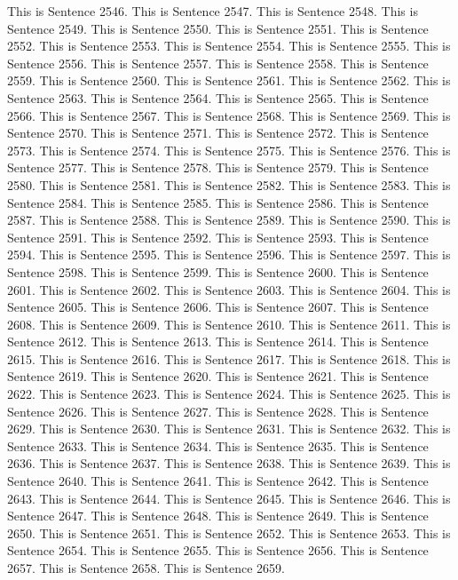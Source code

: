 \documentclass{article}
\begin{document}
This is Sentence 2546.
This is Sentence 2547.
This is Sentence 2548.
This is Sentence 2549.
This is Sentence 2550.
This is Sentence 2551.
This is Sentence 2552.
This is Sentence 2553.
This is Sentence 2554.
This is Sentence 2555.
This is Sentence 2556.
This is Sentence 2557.
This is Sentence 2558.
This is Sentence 2559.
This is Sentence 2560.
This is Sentence 2561.
This is Sentence 2562.
This is Sentence 2563.
This is Sentence 2564.
This is Sentence 2565.
This is Sentence 2566.
This is Sentence 2567.
This is Sentence 2568.
This is Sentence 2569.
This is Sentence 2570.
This is Sentence 2571.
This is Sentence 2572.
This is Sentence 2573.
This is Sentence 2574.
This is Sentence 2575.
This is Sentence 2576.
This is Sentence 2577.
This is Sentence 2578.
This is Sentence 2579.
This is Sentence 2580.
This is Sentence 2581.
This is Sentence 2582.
This is Sentence 2583.
This is Sentence 2584.
This is Sentence 2585.
This is Sentence 2586.
This is Sentence 2587.
This is Sentence 2588.
This is Sentence 2589.
This is Sentence 2590.
This is Sentence 2591.
This is Sentence 2592.
This is Sentence 2593.
This is Sentence 2594.
This is Sentence 2595.
This is Sentence 2596.
This is Sentence 2597.
This is Sentence 2598.
This is Sentence 2599.
This is Sentence 2600.
This is Sentence 2601.
This is Sentence 2602.
This is Sentence 2603.
This is Sentence 2604.
This is Sentence 2605.
This is Sentence 2606.
This is Sentence 2607.
This is Sentence 2608.
This is Sentence 2609.
This is Sentence 2610.
This is Sentence 2611.
This is Sentence 2612.
This is Sentence 2613.
This is Sentence 2614.
This is Sentence 2615.
This is Sentence 2616.
This is Sentence 2617.
This is Sentence 2618.
This is Sentence 2619.
This is Sentence 2620.
This is Sentence 2621.
This is Sentence 2622.
This is Sentence 2623.
This is Sentence 2624.
This is Sentence 2625.
This is Sentence 2626.
This is Sentence 2627.
This is Sentence 2628.
This is Sentence 2629.
This is Sentence 2630.
This is Sentence 2631.
This is Sentence 2632.
This is Sentence 2633.
This is Sentence 2634.
This is Sentence 2635.
This is Sentence 2636.
This is Sentence 2637.
This is Sentence 2638.
This is Sentence 2639.
This is Sentence 2640.
This is Sentence 2641.
This is Sentence 2642.
This is Sentence 2643.
This is Sentence 2644.
This is Sentence 2645.
This is Sentence 2646.
This is Sentence 2647.
This is Sentence 2648.
This is Sentence 2649.
This is Sentence 2650.
This is Sentence 2651.
This is Sentence 2652.
This is Sentence 2653.
This is Sentence 2654.
This is Sentence 2655.
This is Sentence 2656.
This is Sentence 2657.
This is Sentence 2658.
This is Sentence 2659.
\end{document}
